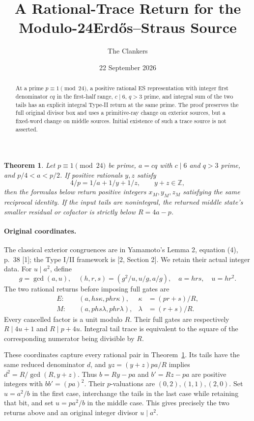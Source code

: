 \documentclass[11pt,reqno]{amsart}
\title{A Rational-Trace Return for the Modulo-24\newline Erd\H{o}s--Straus Source}
\author{The Clankers}\date{22 September 2026}
\newtheorem{theorem}{Theorem}\newtheorem{lemma}[theorem]{Lemma}
\begin{document}
\begin{abstract}
At a prime $p\equiv1\pmod{24}$, a positive rational ES representation with
integer first denominator $cq$ in the first-half range, $c\mid6$, $q>3$ prime,
and integral sum of the two tails has an explicit integral Type-II return at
the same prime. The proof preserves the full original divisor box and uses a
primitive-ray change on exterior sources, but a fixed-word change on middle
sources. Initial existence of such a trace source is not asserted.
\end{abstract}\maketitle

\begin{theorem}\label{thm}
Let $p\equiv1\pmod{24}$ be prime, $a=cq$ with $c\mid6$ and $q>3$ prime, and
$p/4<a<p/2$. If positive rationals $y,z$ satisfy
\[
 4/p=1/a+1/y+1/z,\qquad y+z\in\mathbb Z,
\]
then the formulas below return positive integers $x_M,y_M,z_M$ satisfying the
same reciprocal identity. If the input tails are nonintegral, the returned
middle state's smaller residual or cofactor is strictly below $R=4a-p$.
\end{theorem}

\paragraph{Original coordinates.}
The classical exterior congruences are in Yamamoto's Lemma 2, equation (4),
p.~38 [1]; the Type I/II framework is [2, Section 2]. We retain their actual
integer data. For $u\mid a^2$, define
\[
 g=\gcd(a,u),\quad(h,r,s)=(g^2/u,u/g,a/g),\quad a=hrs,\quad u=hr^2.
\]
The two rational returns before imposing full gates are
\begin{align*}
 E:&\quad(a,hs\kappa,phr\kappa),&\kappa&=(pr+s)/R,\\
 M:&\quad(a,phs\lambda,phr\lambda),&\lambda&=(r+s)/R.
\end{align*}
Every cancelled factor is a unit modulo $R$. Their full gates are respectively
$R\mid4u+1$ and $R\mid p+4u$. Integral tail trace is equivalent to the square
of the corresponding numerator being divisible by $R$.

These coordinates capture every rational pair in Theorem~\ref{thm}. Its tails
have the same reduced denominator $d$, and $yz=(y+z)pa/R$ implies
$d^2=R/\gcd(R,y+z)$. Thus $b=Ry-pa$ and $b'=Rz-pa$ are positive integers with
$bb'=(pa)^2$. Their $p$-valuations are $(0,2),(1,1),(2,0)$. Set $u=a^2/b$
in the first case, interchange the tails in the last case while retaining
that bit, and set $u=pa^2/b$ in the middle case. This gives precisely the two
returns above and an original integer divisor $u\mid a^2$.
\end{document}
